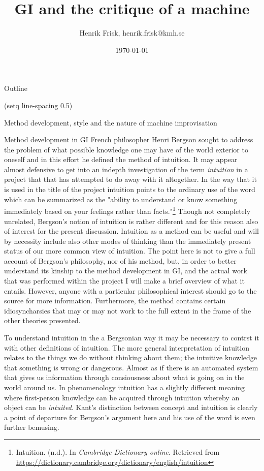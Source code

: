 \documentclass[presentation]{beamer}
\author{Henrik Frisk, henrik.frisk@kmh.se}
\date{\today}
\title{GI and the critique of a machine}
\begin{document}
\maketitle
\begin{frame}{Outline}
\tableofcontents
\end{frame}

(setq line-spacing 0.5)
\begin{frame}[label={sec:org08c5441}]{Method development, style and the nature of machine improvisation}
\begin{block}{Method development in GI}
French philosopher Henri Bergson sought to address the problem of what possible knowledge one may have of the world exterior to oneself and in this effort he defined the method of intuition. It may appear almost defensive to get into an indepth investigation of the term \emph{intuition} in a project that that has attempted to do away with it altogether. In the way that it is used in the title of the project intuition points to the ordinary use of the word which can be summarized as the "ability to understand or know something immediately based on your feelings rather than facts."\footnote{Intuition. (n.d.). In \emph{Cambridge Dictionary online}. Retrieved from \url{https://dictionary.cambridge.org/dictionary/english/intuition}} Though not completely unrelated, Bergson's notion of intuition is rather different and for this reason also of interest for the present discussion. Intuition as a method can be useful and will by necessity include also other modes of thinking than the immediately present status of our more common view of intuition. The point here is not to give a full account of Bergson's philosophy, nor of his method, but, in order to better understand its kinship to the method development in GI, and the actual work that was performed within the project I will make a brief overview of what it entails. However, anyone with a particular philosophical interest should go to the source for more information. Furthermore, the method contains certain idiosyncharsies that may or may not work to the full extent in the frame of the other theories presented.

To understand intuition in the a Bergsonian way it may be necessary to contrst it with other definitions of intuition. The more general interpretation of intuition relates to the things we do without thinking about them; the intuitive knowledge that something is wrong or dangerous. Almost as if there is an automated system that gives us information through consiousness about what is going on in the world around us. In phenomenology intuition has a slightly different meaning where first-person knowledge can be acquired through intuition whereby an object can be \emph{intuited}. Kant's distinction between concept and intuition is clearly a point of departure for Bergson's argument here and his use of the word is even further bemusing.


\end{block}
\end{frame}
\end{document}
